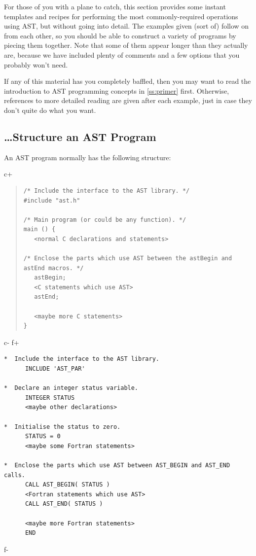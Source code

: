 \documentclass[twoside,11pt]{article}
\newcommand{\secref}[1]{\S\ref{#1}}
\renewcommand{\secref}[1]{\ref{#1}}
\begin{document}
For those of you with a plane to catch, this section provides some
instant templates and recipes for performing the most
commonly-required operations using AST, but without going into
detail. The examples given (sort of) follow on from each other, so you
should be able to construct a variety of programs by piecing them
together.  Note that some of them appear longer than they actually
are, because we have included plenty of comments and a few options
that you probably won't need.

If any of this material has you completely baffled, then you may want
to read the introduction to AST programming concepts in
\secref{ss:primer} first. Otherwise, references to more detailed
reading are given after each example, just in case they don't quite do
what you want.

\subsection{\ldots Structure an AST Program}

An AST program normally has the following structure:

c+
\begin{quote}
\small
\begin{verbatim}
/* Include the interface to the AST library. */
#include "ast.h"

/* Main program (or could be any function). */
main () {
   <normal C declarations and statements>

/* Enclose the parts which use AST between the astBegin and astEnd macros. */
   astBegin;
   <C statements which use AST>
   astEnd;

   <maybe more C statements>
}
\end{verbatim}
\normalsize
\end{quote}
c-
f+
\small
\begin{verbatim}
*  Include the interface to the AST library.
      INCLUDE 'AST_PAR'

*  Declare an integer status variable.
      INTEGER STATUS
      <maybe other declarations>

*  Initialise the status to zero.
      STATUS = 0
      <maybe some Fortran statements>

*  Enclose the parts which use AST between AST_BEGIN and AST_END calls.
      CALL AST_BEGIN( STATUS )
      <Fortran statements which use AST>
      CALL AST_END( STATUS )

      <maybe more Fortran statements>
      END
\end{verbatim}
\normalsize
f-
\end{document}
